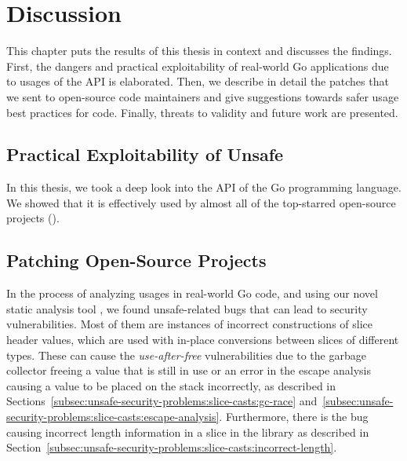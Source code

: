 
\chapter{Discussion}\label{ch:discussion}

This chapter puts the results of this thesis in context and discusses the findings.
First, the dangers and practical exploitability of real-world Go applications due to usages of the \unsafe{} API is
elaborated.
Then, we describe in detail the patches that we sent to open-source code maintainers and give suggestions towards safer
usage best practices for \unsafe{} code.
Finally, threats to validity and future work are presented.



\section{Practical Exploitability of Unsafe}\label{sec:discussion:exploitability}

In this thesis, we took a deep look into the \unsafe{} API of the Go programming language.
We showed that it is effectively used by almost all of the \projsAnalyzed{} top-starred open-source projects
(\percentageUnsafeTransitiveWithDependencies{}).



\section{Patching Open-Source Projects}\label{sec:discussion:patches}

In the process of analyzing \unsafe{} usages in real-world Go code, and using our novel static analysis tool
\toolSafer{}, we found \numberBugsFixed{} unsafe-related bugs that can lead to security vulnerabilities.
Most of them are instances of incorrect constructions of slice header values, which are used with in-place conversions
between slices of different types.
These can cause the \textit{use-after-free} vulnerabilities due to the garbage collector freeing a value that is still
in use or an error in the escape analysis causing a value to be placed on the stack incorrectly, as described in
Sections~\ref{subsec:unsafe-security-problems:slice-casts:gc-race}
and~\ref{subsec:unsafe-security-problems:slice-casts:escape-analysis}.
Furthermore, there is the bug causing incorrect length information in a slice in the \goFuse{} library as described in
Section~\ref{subsec:unsafe-security-problems:slice-casts:incorrect-length}.

